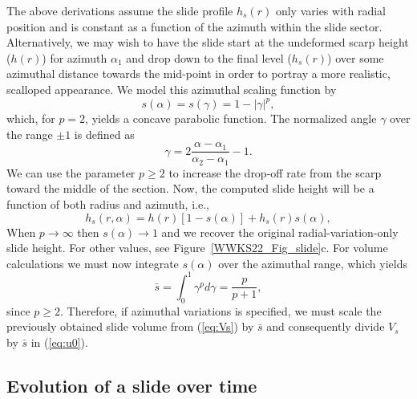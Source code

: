 The above derivations assume the slide profile $h_s(r)$ only varies with radial position and is constant as a function
of the azimuth within the slide sector. Alternatively, we may wish to have the slide start at the undeformed scarp height
($h(r)$) for azimuth $\alpha_1$ and drop down to the final level ($h_s(r)$) over some azimuthal distance towards the mid-point in order
to portray a more realistic, scalloped appearance. We model this azimuthal scaling function by
\begin{equation*}
s(\alpha) = s(\gamma) = 1 - \left |\gamma\right|^p,
\end{equation*}
which, for $p = 2$, yields a concave parabolic function. The normalized angle $\gamma$ over the range $\pm1$ is defined as
\begin{equation*}
\gamma = 2\frac{\alpha - \alpha_1}{\alpha_2 - \alpha_1} - 1.
\end{equation*}
We can use the parameter $p \ge 2$ to increase the drop-off rate from the scarp toward the middle of the section.
Now, the computed slide height will be a function of both radius and azimuth, i.e.,
\begin{equation*}
h_s(r, \alpha) = h(r) \left [1 - s(\alpha)\right ] + h_s(r) s(\alpha),
\end{equation*}
When $p \rightarrow \infty$ then $s(\alpha) \rightarrow 1$ and we recover the original radial-variation-only slide height.
For other values, see Figure~\ref{WWKS22_Fig_slide}c. For volume calculations we must now integrate $s(\alpha)$ over the azimuthal range,
which yields
\begin{equation*}
\bar{s} = \int_0^1  \gamma^p d\gamma = \frac{p}{p+1},
\end{equation*}
since $p \ge 2$. Therefore, if azimuthal variations is specified, we must scale the previously obtained slide volume from
(\ref{eq:Vs}) by $\bar{s}$ and consequently divide $V_s$ by $\bar{s}$ in (\ref{eq:u0}).

\subsection{Evolution of a slide over time}

